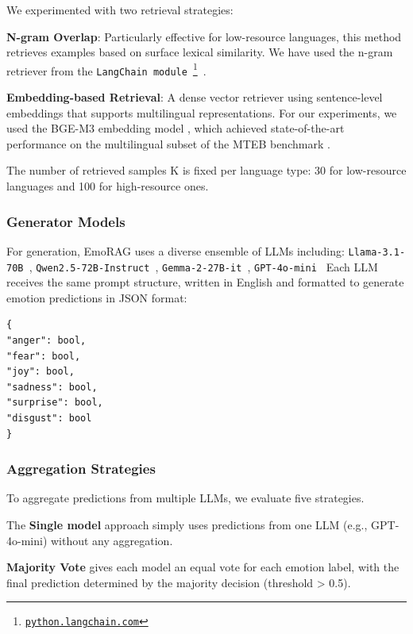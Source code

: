 \documentclass[a4paper,12pt]{extarticle}
\begin{document}
We experimented with two retrieval strategies:


\textbf{N-gram Overlap}: Particularly effective for low-resource languages, this method retrieves examples based on surface lexical similarity. We have used the n-gram retriever from the 
\texttt{LangChain module}~\footnote{\href{https://python.langchain.com/docs/how_to/example_selectors_ngram}{\texttt{python.langchain.com}}}~\cite{Chase_LangChain_2022}. 


\textbf{Embedding-based Retrieval}: A dense vector retriever using sentence-level embeddings that supports multilingual representations. For our experiments, we used the BGE-M3 embedding model \cite{chen2024bgem3embeddingmultilingualmultifunctionality}, which achieved state-of-the-art performance on the multilingual subset of the MTEB benchmark \cite{muennighoff2023mtebmassivetextembedding}.

The number of retrieved samples K is fixed per language type: 30 for low-resource languages and 100 for high-resource ones.

\subsubsection{Generator Models}

For generation, EmoRAG uses a diverse ensemble of LLMs including:
\texttt{Llama-3.1-70B \cite{grattafiori2024llama3herdmodels}}, \texttt{Qwen2.5-72B-Instruct \cite{yang2024qwen2technicalreport}}, \texttt{Gemma-2-27B-it \cite{gemmateam2024gemma2improvingopen}}, \texttt{GPT-4o-mini \cite{openai2024gpt4omini}}
Each LLM receives the same prompt structure, written in English and formatted to generate emotion predictions in JSON format:
\begin{verbatim}
{
"anger": bool,
"fear": bool,
"joy": bool,
"sadness": bool,
"surprise": bool,
"disgust": bool
}
\end{verbatim}

\subsubsection{Aggregation Strategies}

To aggregate predictions from multiple LLMs, we evaluate five strategies. 

The \textbf{Single model} approach simply uses predictions from one LLM (e.g., GPT-4o-mini) without any aggregation. 

\textbf{Majority Vote} gives each model an equal vote for each emotion label, with the final prediction determined by the majority decision (threshold > 0.5). 
\end{document}
